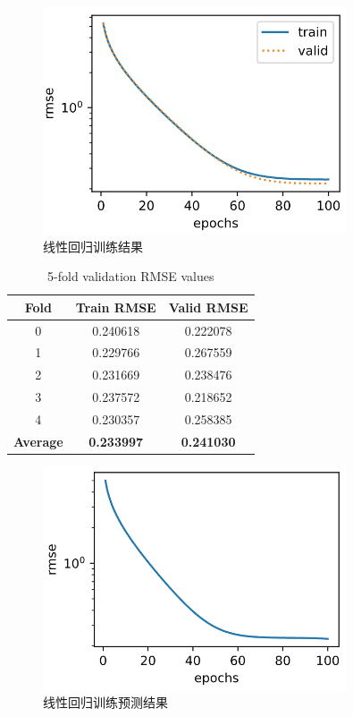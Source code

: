 \documentclass[a4paper,12pt]{article}
\begin{document}
\begin{figure}[htbp]
	\centering
	\includegraphics[width=0.8\textwidth]{18.png}
	\caption{线性回归训练结果}
\end{figure}

\begin{table}[h]
	\centering
	\caption{5-fold validation RMSE values}
	\label{tab:rmse_values}
	\begin{tabular}{|c|c|c|}
		\hline
		\textbf{Fold} & \textbf{Train RMSE} & \textbf{Valid RMSE} \\ \hline
		0 & 0.240618 & 0.222078 \\ \hline
		1 & 0.229766 & 0.267559 \\ \hline
		2 & 0.231669 & 0.238476 \\ \hline
		3 & 0.237572 & 0.218652 \\ \hline
		4 & 0.230357 & 0.258385 \\ \hline
		\textbf{Average} & \textbf{0.233997} & \textbf{0.241030} \\ \hline
	\end{tabular}
\end{table}

\begin{figure}[htbp]
	\centering
	\includegraphics[width=0.8\textwidth]{19.png}
	\caption{线性回归训练预测结果}
\end{figure}
\end{document}
